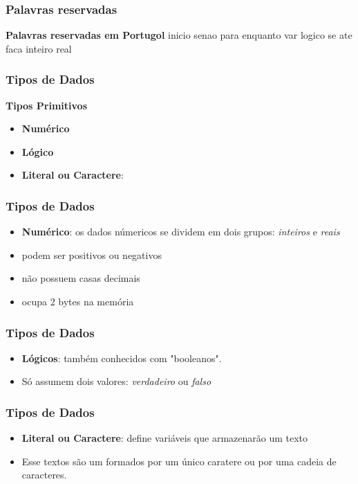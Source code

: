 \begin{frame}
	\frametitle{Palavras reservadas}
	\begin{block}{\textbf{Palavras reservadas em Portugol}}
		inicio senao para enquanto var logico se ate faca inteiro real
	\end{block}
\end{frame}



\begin{frame}
	\frametitle{Tipos de Dados}
	\begin{block}{\textbf{Tipos Primitivos}}
		\begin{itemize}
			\item \textbf{Numérico}
			\item \textbf{Lógico}
			\item \textbf{Literal ou Caractere}:
		\end{itemize}
	\end{block}
\end{frame}




\begin{frame}
	\frametitle{Tipos de Dados}
		\begin{itemize}
			\item \textbf{Numérico}: os dados númericos se dividem em dois grupos: \textit{inteiros} e \textit{reais}
			\item podem ser positivos ou negativos
			\item não possuem casas decimais
			\item ocupa 2 bytes na memória
		\end{itemize}
\end{frame}




\begin{frame}
	\frametitle{Tipos de Dados}
		\begin{itemize}
			\item \textbf{Lógicos}: também conhecidos com "booleanos".
			\item Só assumem dois valores: \textit{verdadeiro} ou \textit{falso}
		\end{itemize}
\end{frame}



\begin{frame}
	\frametitle{Tipos de Dados}
		\begin{itemize}
			\item \textbf{Literal ou Caractere}: define variáveis que armazenarão um texto
			\item  Esse textos são um formados por um único caratere ou por uma cadeia de caracteres. 
		\end{itemize}
\end{frame}







